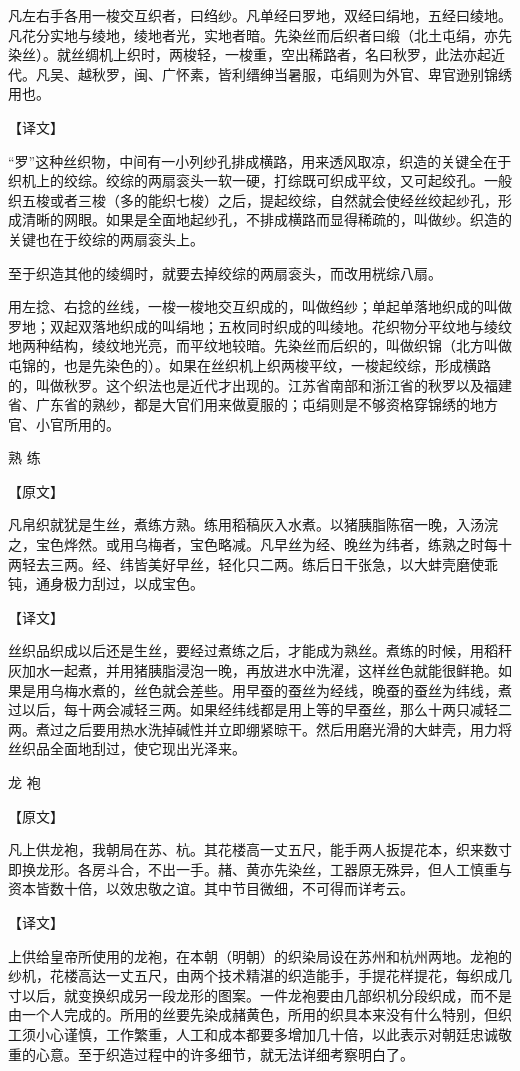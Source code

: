 \documentclass[12pt,UTF8]{ctexbook}
\begin{document}
凡左右手各用一梭交互织者，曰绉纱。凡单经曰罗地，双经曰绢地，五经曰绫地。凡花分实地与绫地，绫地者光，实地者暗。先染丝而后织者曰缎（北土屯绢，亦先染丝）。就丝绸机上织时，两梭轻，一梭重，空出稀路者，名曰秋罗，此法亦起近代。凡吴、越秋罗，闽、广怀素，皆利缙绅当暑服，屯绢则为外官、卑官逊别锦绣用也。

【译文】

“罗”这种丝织物，中间有一小列纱孔排成横路，用来透风取凉，织造的关键全在于织机上的绞综。绞综的两扇衮头一软一硬，打综既可织成平纹，又可起绞孔。一般织五梭或者三梭（多的能织七梭）之后，提起绞综，自然就会使经丝绞起纱孔，形成清晰的网眼。如果是全面地起纱孔，不排成横路而显得稀疏的，叫做纱。织造的关键也在于绞综的两扇衮头上。

至于织造其他的绫绸时，就要去掉绞综的两扇衮头，而改用桄综八扇。

用左捻、右捻的丝线，一梭一梭地交互织成的，叫做绉纱；单起单落地织成的叫做罗地；双起双落地织成的叫绢地；五枚同时织成的叫绫地。花织物分平纹地与绫纹地两种结构，绫纹地光亮，而平纹地较暗。先染丝而后织的，叫做织锦（北方叫做屯锦的，也是先染色的）。如果在丝织机上织两梭平纹，一梭起绞综，形成横路的，叫做秋罗。这个织法也是近代才出现的。江苏省南部和浙江省的秋罗以及福建省、广东省的熟纱，都是大官们用来做夏服的；屯绢则是不够资格穿锦绣的地方官、小官所用的。

熟 练

【原文】

凡帛织就犹是生丝，煮练方熟。练用稻稿灰入水煮。以猪胰脂陈宿一晚，入汤浣之，宝色烨然。或用乌梅者，宝色略减。凡早丝为经、晚丝为纬者，练熟之时每十两轻去三两。经、纬皆美好早丝，轻化只二两。练后日干张急，以大蚌壳磨使乖钝，通身极力刮过，以成宝色。

【译文】

丝织品织成以后还是生丝，要经过煮练之后，才能成为熟丝。煮练的时候，用稻秆灰加水一起煮，并用猪胰脂浸泡一晚，再放进水中洗濯，这样丝色就能很鲜艳。如果是用乌梅水煮的，丝色就会差些。用早蚕的蚕丝为经线，晚蚕的蚕丝为纬线，煮过以后，每十两会减轻三两。如果经纬线都是用上等的早蚕丝，那么十两只减轻二两。煮过之后要用热水洗掉碱性并立即绷紧晾干。然后用磨光滑的大蚌壳，用力将丝织品全面地刮过，使它现出光泽来。

龙 袍

【原文】

凡上供龙袍，我朝局在苏、杭。其花楼高一丈五尺，能手两人扳提花本，织来数寸即换龙形。各房斗合，不出一手。赭、黄亦先染丝，工器原无殊异，但人工慎重与资本皆数十倍，以效忠敬之谊。其中节目微细，不可得而详考云。

【译文】

上供给皇帝所使用的龙袍，在本朝（明朝）的织染局设在苏州和杭州两地。龙袍的纱机，花楼高达一丈五尺，由两个技术精湛的织造能手，手提花样提花，每织成几寸以后，就变换织成另一段龙形的图案。一件龙袍要由几部织机分段织成，而不是由一个人完成的。所用的丝要先染成赭黄色，所用的织具本来没有什么特别，但织工须小心谨慎，工作繁重，人工和成本都要多增加几十倍，以此表示对朝廷忠诚敬重的心意。至于织造过程中的许多细节，就无法详细考察明白了。
\end{document}
